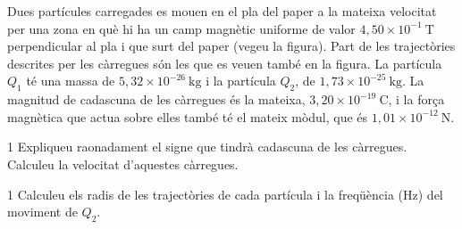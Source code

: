 Dues partícules carregades es mouen en el pla del paper a la mateixa velocitat per una zona en què hi ha un camp magnètic uniforme de valor $4,50\times 10^{-1}\ \mathrm{T}$ perpendicular al pla i que surt del paper (vegeu la figura). Part de les trajectòries descrites per les càrregues són les que es veuen també en la figura. La partícula $Q_1$ té una massa de $5,32\times 10^{-26}\ \mathrm{kg}$ i la partícula $Q_2$, de $1,73\times 10^{-25}\ \mathrm{kg}$. La magnitud de cadascuna de les càrregues és la mateixa, $3,20\times 10^{-19}\ \mathrm{C}$, i la força magnètica que actua sobre elles també té el mateix mòdul, que és $1,01\times 10^{-12}\ \mathrm{N}$.


\begin{apartat}{1}
Expliqueu raonadament el signe que tindrà cadascuna de les càrregues. Calculeu la velocitat d'aquestes càrregues.
\end{apartat}

\begin{apartat}{1}
Calculeu els radis de les trajectòries de cada partícula i la freqüència (Hz) del moviment de $Q_2$.
\end{apartat}
